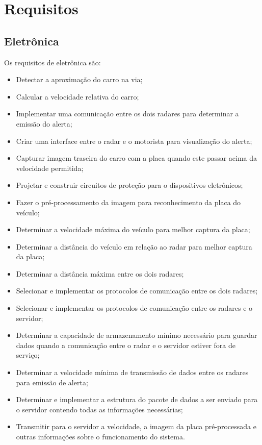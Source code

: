 \section{Requisitos}
\subsection{Eletrônica}

Os requisitos de eletrônica são:
	
\begin{itemize}
	\item Detectar a aproximação do carro na via;
    \item Calcular a velocidade relativa do carro;
    \item Implementar uma comunicação entre os dois radares para determinar a emissão do alerta;
    \item Criar uma interface entre o radar e o motorista para visualização do alerta;
    \item Capturar imagem traseira do carro com a placa quando este passar acima da velocidade permitida;
    \item Projetar e construir circuitos de proteção para o dispositivos eletrônicos;
    \item Fazer o pré-processamento da imagem para reconhecimento da placa do veículo;
    \item Determinar a velocidade máxima do veículo para melhor captura da placa;
    \item Determinar a distância do veículo em relação ao radar para melhor captura da placa;
    \item Determinar a distância máxima entre os dois radares;
    \item Selecionar e implementar os protocolos de comunicação entre os dois radares;
    \item Selecionar e implementar os protocolos de comunicação entre os radares e o servidor;
     \item Determinar a capacidade de armazenamento mínimo necessário para guardar dados quando a comunicação entre o radar e o servidor estiver fora de serviço;
     \item Determinar a velocidade mínima de transmissão de dados entre os radares para emissão de alerta;
     \item Determinar e implementar a estrutura do pacote de dados a ser enviado para o servidor contendo todas as informações necessárias;
     \item Transmitir para o servidor a velocidade, a imagem da placa pré-processada  e outras informações sobre o funcionamento do sistema.
\end{itemize}    
    
